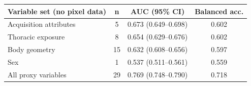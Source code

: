 \begin{tabular}{lccc}
\toprule
Variable set (no pixel data) & n & AUC (95\% CI) & Balanced acc. \\
\midrule
Acquisition attributes & 5 & 0.673 (0.649--0.698) & 0.602 \\
Thoracic exposure & 8 & 0.654 (0.629--0.676) & 0.602 \\
Body geometry & 15 & 0.632 (0.608--0.656) & 0.597 \\
Sex & 1 & 0.537 (0.511--0.561) & 0.559 \\
All proxy variables & 29 & 0.769 (0.748--0.790) & 0.718 \\
\bottomrule
\end{tabular}
